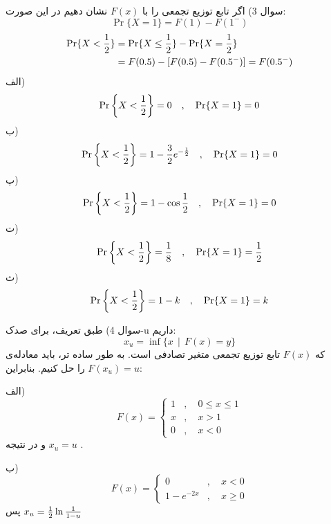\documentclass[10pt,letterpaper]{article}
\begin{document}
سوال 3) اگر تابع توزیع تجمعی را با $F(x)$ نشان دهیم در این صورت:
$$
\Pr\{X=1\}=F(1)-F(1^-)
$$
\[
\begin{split}
\Pr\{X<{1\over 2}\}&=\Pr\{X\le{1\over 2}\}-\Pr\{X={1\over 2}\}\\&=F(0.5)-[F(0.5)-F(0.5^-)]=F(0.5^-)
\end{split}
\]
الف)
$$
\Pr\left\{X<{1\over 2}\right\}=0\quad ,\quad \Pr\{X=1\}=0
$$
ب)
$$
\Pr\left\{X<{1\over 2}\right\}=1-{3\over 2}e^{-{1\over 2}}\quad ,\quad \Pr\{X=1\}=0
$$
پ)
$$
\Pr\left\{X<{1\over 2}\right\}=1-\cos{1\over 2}\quad ,\quad \Pr\{X=1\}=0
$$
ت)
$$
\Pr\left\{X<{1\over 2}\right\}={1\over 8}\quad ,\quad \Pr\{X=1\}={1\over 2}
$$
ث)
$$
\Pr\left\{X<{1\over 2}\right\}=1-k\quad ,\quad \Pr\{X=1\}=k
$$

سوال 4) طبق تعریف، برای صدک-u داریم:
$$
x_u=\inf\{x\ \ |\ \ F(x)=y\}
$$
که $F(x)$ تابع توزیع تجمعی متغیر تصادفی است. به طور ساده تر، باید معادله‌ی 
$
F(x_u)=u
$
را حل کنیم. بنابراین:

الف)
$$
F(x)=\begin{cases}
1&,\quad 0\le x\le 1\\
x&,\quad x>1\\
0&,\quad x<0
\end{cases}
$$
و در نتیجه
$
x_u=u
$
.

ب)
$$
F(x)=\begin{cases}
0&,\quad x<0\\
1-e^{-2x}&,\quad x\ge 0
\end{cases}
$$
پس
$
x_u={1\over 2}\ln {1\over 1-u}
$
\end{document}
